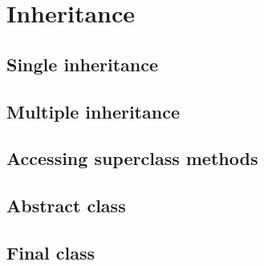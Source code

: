 \documentclass{KodeBook}
\begin{document}
	\chapter{Inheritance}
\fi


\section{Single inheritance}


\section{Multiple inheritance}


\section{Accessing superclass methods}


\section{Abstract class}

\section{Final class}



\ifx\wholebook\relax\else
% 
% 
	
\end{document}
